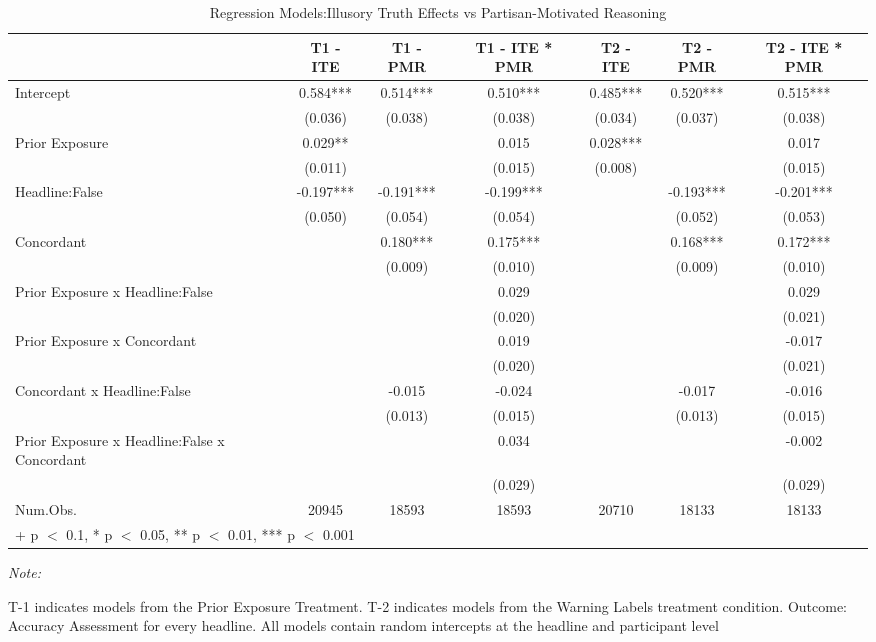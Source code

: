 \begin{table}

\caption{Regression Models:Illusory Truth Effects vs Partisan-Motivated Reasoning}
\centering
\begin{threeparttable}
\begin{tabular}[t]{lcccccc}
\toprule
  & T1 - ITE & T1 - PMR & T1 - ITE * PMR & T2 - ITE & T2 - PMR & T2 - ITE * PMR\\
\midrule
Intercept & 0.584*** & 0.514*** & 0.510*** & 0.485*** & 0.520*** & 0.515***\\
 & (0.036) & (0.038) & (0.038) & (0.034) & (0.037) & (0.038)\\
Prior Exposure & 0.029** &  & 0.015 & 0.028*** &  & 0.017\\
 & (0.011) &  & (0.015) & (0.008) &  & (0.015)\\
Headline:False & -0.197*** & -0.191*** & -0.199*** &  & -0.193*** & -0.201***\\
 & (0.050) & (0.054) & (0.054) &  & (0.052) & (0.053)\\
Concordant &  & 0.180*** & 0.175*** &  & 0.168*** & 0.172***\\
 &  & (0.009) & (0.010) &  & (0.009) & (0.010)\\
Prior Exposure x Headline:False &  &  & 0.029 &  &  & 0.029\\
 &  &  & (0.020) &  &  & \vphantom{1} (0.021)\\
Prior Exposure x Concordant &  &  & 0.019 &  &  & -0.017\\
 &  &  & (0.020) &  &  & (0.021)\\
Concordant x Headline:False &  & -0.015 & -0.024 &  & -0.017 & -0.016\\
 &  & (0.013) & (0.015) &  & (0.013) & (0.015)\\
Prior Exposure x Headline:False x Concordant &  &  & 0.034 &  &  & -0.002\\
 &  &  & (0.029) &  &  & (0.029)\\
\midrule
Num.Obs. & 20945 & 18593 & 18593 & 20710 & 18133 & 18133\\
\bottomrule
\multicolumn{7}{l}{\rule{0pt}{1em}+ p $<$ 0.1, * p $<$ 0.05, ** p $<$ 0.01, *** p $<$ 0.001}\\
\end{tabular}
\begin{tablenotes}
\item \textit{Note: } 
\item T-1 indicates models from the Prior Exposure Treatment. T-2 indicates models from the Warning Labels treatment condition. Outcome: Accuracy Assessment for every headline. All models contain random intercepts at the headline and participant level
\end{tablenotes}
\end{threeparttable}
\end{table}
